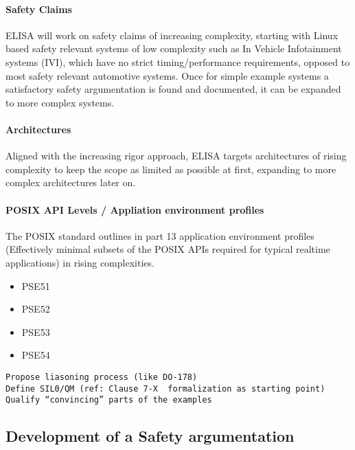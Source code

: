 \documentclass[12pt]{ElisaPaper}
\begin{document}
\paragraph{Safety Claims}
ELISA will work on safety claims of increasing complexity, starting with Linux based safety relevant systems of low complexity such as In Vehicle Infotainment systems (IVI), which have no strict timing/performance requirements, opposed to most safety relevant automotive systems.
Once for simple example systems a satisfactory safety argumentation is found and documented, it can be expanded to more complex systems.
\paragraph{Architectures}
Aligned with the increasing rigor approach, ELISA targets architectures of rising complexity to keep the scope as limited as possible at first, expanding to more complex architectures later on.
\paragraph{POSIX API Levels / Appliation environment profiles}
The POSIX standard  \cite{IEEE1003.1:2010} outlines in part 13 \cite{IEEE1003.13:2003} application environment profiles (Effectively minimal subsets of the POSIX APIs required for typical realtime applications) in rising complexities.
\begin{itemize}
\item PSE51
\item PSE52
\item PSE53
\item PSE54
\end{itemize}

\begin{verbatim}
Propose liasoning process (like DO-178)
Define SIL0/QM (ref: Clause 7-X  formalization as starting point)
Qualify “convincing” parts of the examples  
\end{verbatim}

\subsection{Development of a Safety argumentation}
\end{document}
